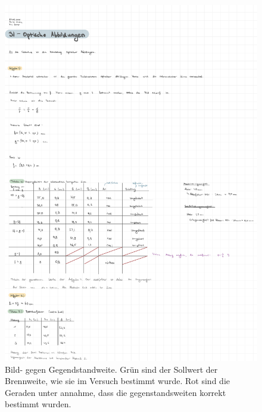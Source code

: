 \begin{figure}[h!]
    \centering
    \includegraphics[width=\textwidth, page=6]{Protokolle/31/Chapter/Messprotokoll.pdf}
    \caption{Bild- gegen Gegendstandweite. Grün sind der Sollwert der Brennweite, wie sie im Versuch bestimmt wurde. Rot sind die Geraden unter annahme, dass die gegenstandsweiten korrekt bestimmt wurden.}
    \label{fig:auswertung_achromat3}
\end{figure}

